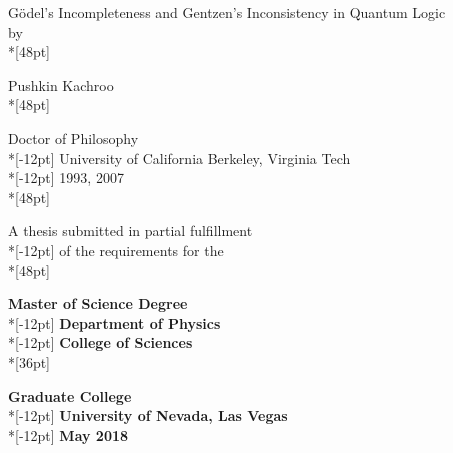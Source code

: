 \thispagestyle{empty}%
\begin{center}
G\"odel's Incompleteness and Gentzen's Inconsistency in Quantum Logic 
\\[48pt]%

\normalsize by \\*[48pt]

Pushkin Kachroo \\*[48pt]

Doctor of Philosophy \\*[-12pt]%
 University of California Berkeley, Virginia Tech\\*[-12pt]
 1993, 2007\\*[48pt]

 A thesis submitted in partial fulfillment\\*[-12pt]
 of the requirements for the \\*[48pt]


 {\bf Master of Science Degree} \\*[-12pt]
 {\bf Department of Physics} \\*[-12pt]
 {\bf College of Sciences} \\*[36pt]

\normalsize
 {\bf Graduate College} \\*[-12pt]
 {\bf University of Nevada, Las Vegas} \\*[-12pt]
 {\bf May 2018}
\end{center}